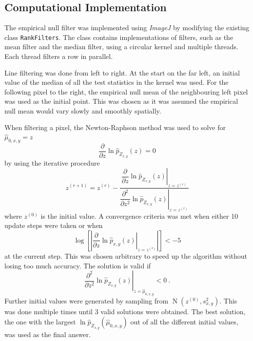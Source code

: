 \documentclass{article}
\DeclareMathOperator{\normal}{N}
\begin{document}
\subsection{Computational Implementation}
\label{subsection:computational}

The empirical null filter was implemented using \emph{ImageJ} \citep{abramoff2004image, perez2013image, schindelin2012fiji, schneider2012nih} by modifying the existing class \texttt{RankFilters}. The class contains implementations of filters, such as the mean filter and the median filter, using a circular kernel and multiple threads. Each thread filters a row in parallel.

Line filtering was done from left to right. At the start on the far left, an initial value of the median of all the test statistics in the kernel was used. For the following pixel to the right, the empirical null mean of the neighbouring left pixel was used as the initial point. This was chosen as it was assumed the empirical null mean would vary slowly and smoothly spatially.

When filtering a pixel, the Newton-Raphson method was used to solve for $\widehat{\mu}_{0,x,y}=z$
\begin{equation}
  \dfrac{\partial}{\partial z}\ln\widehat{p}_{Z_{x,y}}(z) = 0
\end{equation}
by using the iterative procedure
\begin{equation}
  z^{(r+1)} =
  z^{(r)}
  -\dfrac{
    \left.
      \dfrac{
        \partial
      }
      {
        \partial z
      }
      \ln\widehat{p}_{Z_{x,y}}(z)
    \right|_{z = z^{(r)}}
  }
  {
    \left.
      \dfrac{
        \partial^2
      }
      {
        \partial z^2
      }
      \ln\widehat{p}_{Z_{x,y}}(z)
    \right|_{z = z^{(r)}}
  } 
\end{equation}
where $z^{(0)}$ is the initial value. A convergence criteria was met when either 10 update steps were taken or when
\begin{equation}
  \log\left[\left|
    \left.
    \dfrac{
      \partial
    }
    {
      \partial z
    }
  \ln\widehat{p}_{x,y}(z)
  \right|_{z=z^{(r)}}
  \right|\right]
  <-5
\end{equation}
at the current step. This was chosen arbitrary to speed up the algorithm without losing too much accuracy. The solution is valid if
\begin{equation}
  \left.
    \dfrac{
      \partial^2
    }
    {
      \partial z^2
    }
    \ln\widehat{p}_{Z_{x,y}}(z)
  \right|_{z=\widehat{\mu}_{0,x,y}}
  < 0 \ .
\end{equation}
Further initial values were generated by sampling from $\normal(z^{(0)}, s_{x,y}^2)$. This was done multiple times until 3 valid solutions were obtained. The best solution, the one with the largest $\ln\widehat{p}_{Z_{x,y}}\left(\widehat{\mu}_{0,x,y}\right)$ out of all the different initial values, was used as the final answer.
\end{document}
